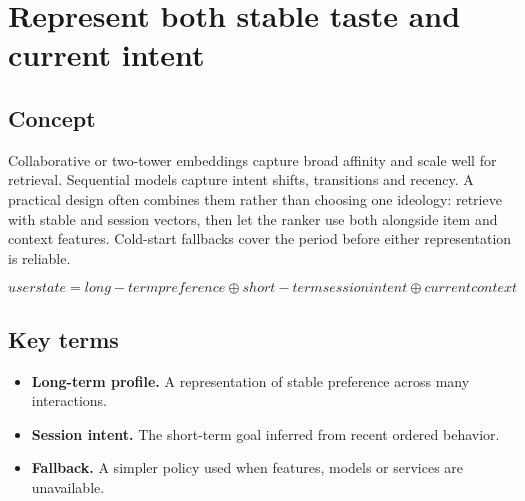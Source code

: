\section{Represent both stable taste and current intent}

\begin{abstract}
Long-term embeddings and recent sequences answer different recommendation questions.
\end{abstract}

\subsection{Concept}
Collaborative or two-tower embeddings capture broad affinity and scale well for retrieval. Sequential models capture intent shifts, transitions and recency. A practical design often combines them rather than choosing one ideology: retrieve with stable and session vectors, then let the ranker use both alongside item and context features. Cold-start fallbacks cover the period before either representation is reliable.

\begin{equation*}
user state = long-term preference ⊕ short-term session intent ⊕ current context
\end{equation*}

\subsection{Key terms}
\begin{itemize}
\item \textbf{Long-term profile.} A representation of stable preference across many interactions.
\item \textbf{Session intent.} The short-term goal inferred from recent ordered behavior.
\item \textbf{Fallback.} A simpler policy used when features, models or services are unavailable.
\end{itemize}
